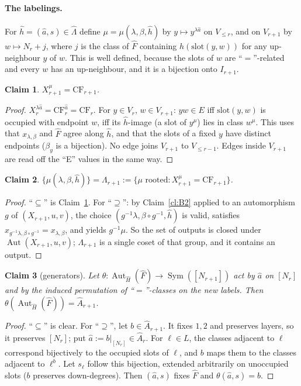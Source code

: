 \documentclass[11pt]{article}
\theoremstyle{plain}
\newtheorem{claim}{Claim}
\theoremstyle{definition}
\theoremstyle{remark}
\theoremstyle{named}
\theoremstyle{namedrm}
\newcommand{\Sym}{\operatorname{Sym}}
\newcommand{\Aut}{\operatorname{Aut}}
\begin{document}
\paragraph{The labelings.} For $\hat h=(\hat a,s)\in\hat\Lambda$ define $\mu=\mu(\lambda,\beta,\hat h)$ by
$y\mapsto y^{\lambda\hat a}$ on $V_{\le r}$, and on $V_{r+1}$ by $w\mapsto N_r+j$, where $j$ is the class of $\hat F$
containing $\hat h(\mathrm{slot}(y,w))$ for any up-neighbour $y$ of $w$. This is well defined, because the slots of
$w$ are ``$=$''-related and every $w$ has an up-neighbour, and it is a bijection onto $I_{r+1}$.

\begin{claim}\label{cl:B3}
$X_{r+1}^\mu=\mathrm{CF}_{r+1}$.
\end{claim}
\begin{proof}
$X_r^{\lambda\hat a}=\mathrm{CF}_r^{\hat a}=\mathrm{CF}_r$. For $y\in V_r$, $w\in V_{r+1}$: $yw\in E$ iff $\mathrm{slot}(y,w)$ is
occupied with endpoint $w$, iff its $\hat h$-image (a slot of $y^\mu$) lies in class $w^\mu$. This uses that
$x_{\lambda,\beta}$ and $\hat F$ agree along $\hat h$, and that the slots of a fixed $y$ have distinct endpoints
($\beta_y$ is a bijection). No edge joins $V_{r+1}$ to $V_{\le r-1}$. Edges inside $V_{r+1}$ are read off the ``E''
values in the same way.
\end{proof}

\begin{claim}\label{cl:B4}
$\{\mu(\lambda,\beta,\hat h)\}=\Lambda_{r+1}:=\{\mu\text{ rooted}:X_{r+1}^\mu=\mathrm{CF}_{r+1}\}$.
\end{claim}
\begin{proof}
``$\subseteq$'' is Claim~\ref{cl:B3}. For ``$\supseteq$'': by Claim~\ref{cl:B2} applied to an automorphism $g$ of
$(X_{r+1},u,v)$, the choice $(g^{-1}\lambda,\beta\circ g^{-1},\hat h)$ is valid, satisfies
$x_{g^{-1}\lambda,\beta\circ g^{-1}}=x_{\lambda,\beta}$, and yields $g^{-1}\mu$. So the set of outputs is closed under
$\Aut(X_{r+1},u,v)$; $\Lambda_{r+1}$ is a single coset of that group, and it contains an output.
\end{proof}

\begin{claim}[generators]\label{cl:B5}
Let $\theta\colon\Aut_{\hat H}(\hat F)\to\Sym([N_{r+1}])$ act by $\hat a$ on $[N_r]$ and by the induced permutation
of ``$=$''-classes on the new labels. Then $\theta(\Aut_{\hat H}(\hat F))=\hat A_{r+1}$.
\end{claim}
\begin{proof}
``$\subseteq$'' is clear. For ``$\supseteq$'', let $b\in\hat A_{r+1}$. It fixes $1,2$ and preserves layers, so it preserves
$[N_r]$; put $\hat a:=b|_{[N_r]}\in\hat A_r$. For $\ell\in L$, the classes adjacent to $\ell$ correspond bijectively
to the occupied slots of $\ell$, and $b$ maps them to the classes adjacent to $\ell^b$. Let $s_\ell$ follow this
bijection, extended arbitrarily on unoccupied slots ($b$ preserves down-degrees). Then $(\hat a,s)$ fixes
$\hat F$ and $\theta(\hat a,s)=b$.
\end{proof}
\end{document}
